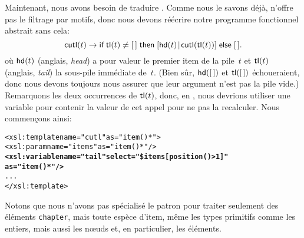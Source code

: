 Maintenant, nous avons besoin de traduire . Comme nous le
savons déjà, \XSLT n'offre pas le filtrage par motifs, donc nous
devons réécrire notre programme fonctionnel abstrait sans cela:
\begin{equation*}
  \textsf{cutl}(t) \rightarrow \textsf{if} \; \textsf{tl}(t) \neq [\,]  \;
  \textsf{then} \; [{\textsf{hd}(t)}\!\mid\!{\textsf{cutl}(\textsf{tl}(t))}] \; \textsf{else} \; [\,].
\end{equation*}
où \(\textsf{hd}(t)\) (anglais, \emph{head})  a
pour valeur le premier item de la pile~\(t\) et \(\textsf{tl}(t)\)
(anglais, \emph{tail})
 la sous-pile immédiate de~\(t\). (Bien sûr,
\(\textsf{hd}([\,])\) et \(\textsf{tl}([\,])\) échoueraient, donc nous
devons toujours nous assurer que leur argument n'est pas la pile
vide.) Remarquons les deux occurrences de \(\textsf{tl}(t)\), donc, en
\XSLT, nous devrions utiliser une variable pour contenir la valeur de
cet appel pour ne pas la recalculer. Nous commençons ainsi:
\begin{alltt}
\small  <xsl:template name="cutl" as="item()*">
    <xsl:param name="items" as="item()*"/>
    \textbf{<xsl:variable name="tail" select="\$items[position()>1]"
                              as="item()*"/>}
    ...
  </xsl:template>
\end{alltt}
Notons que nous n'avons pas spécialisé le patron pour traiter
seulement des éléments \texttt{chapter}, mais toute espèce d'item,
même les types primitifs comme les entiers, mais aussi les n{\oe}uds
et, en particulier, les éléments.

